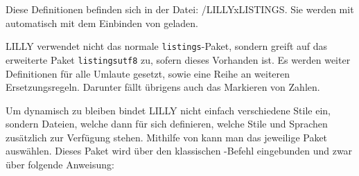 Diese Definitionen befinden sich in der Datei: {\ltt{}/LILLYxLISTINGS}. Sie werden mit  automatisch mit dem Einbinden von  geladen.
\begin{bemerkung}
    LILLY verwendet nicht das normale \verb|listings|-Paket, sondern greift auf das erweiterte Paket \verb|listingsutf8| zu, sofern dieses Vorhanden ist. Es werden weiter Definitionen für alle Umlaute gesetzt, sowie eine Reihe an weiteren Ersetzungsregeln. Darunter fällt übrigens auch das Markieren von Zahlen.
\end{bemerkung}
Um dynamisch zu bleiben bindet LILLY nicht einfach verschiedene Stile ein, sondern Dateien, welche dann für sich definieren, welche Stile und Sprachen zusätzlich zur Verfügung stehen.%
Mithilfe von  kann man das jeweilige Paket auswählen. Dieses Paket wird über den klassischen -Befehl eingebunden und zwar über folgende Anweisung:
{\small\begin{latex}

\end{latex}}

